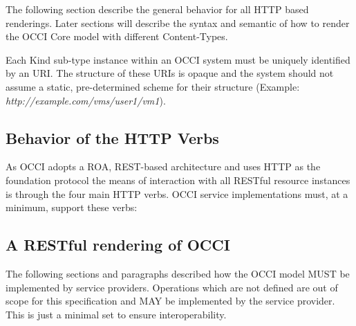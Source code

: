 \documentclass[10pt,a4paper]{article}
\begin{document}
The following section describe the general behavior for all HTTP based
renderings. Later sections will describe the syntax and semantic of
how to render the OCCI Core model with different Content-Types.

Each Kind sub-type instance within an OCCI system must be uniquely
identified by an URI. The structure of these URIs is opaque and the
system should not assume a static, pre-determined scheme for their
structure (Example: \emph{http://example.com/vms/user1/vm1}).

\subsection{Behavior of the HTTP Verbs}
As OCCI adopts a ROA, REST-based architecture and uses HTTP as the
foundation protocol the means of interaction with all RESTful resource
instances is through the four main HTTP verbs. OCCI service
implementations must, at a minimum, support these verbs:


\subsection{A RESTful rendering of OCCI}
The following sections and paragraphs described how the OCCI model
MUST be implemented by service providers. Operations which are not
defined are out of scope for this specification and MAY be implemented
by the service provider. This is just a minimal set to ensure
interoperability.
\end{document}
